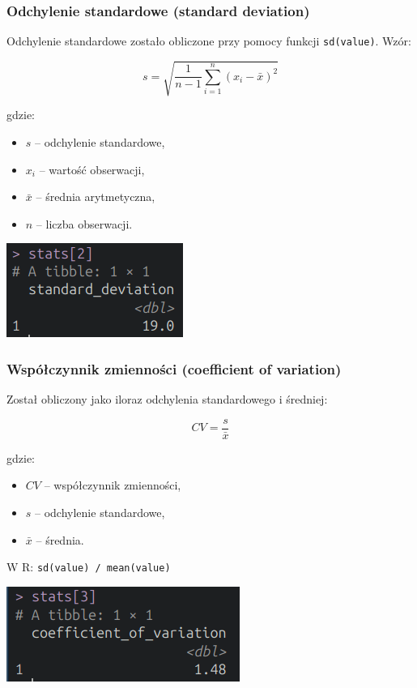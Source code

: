 \documentclass[polish]{article}
\begin{document}
    \subsubsection{Odchylenie standardowe (standard deviation)}

    Odchylenie standardowe zostało obliczone przy pomocy funkcji \texttt{sd(value)}. Wzór:

    \Large
    \[
    s = \sqrt{\frac{1}{n - 1} \sum_{i=1}^{n}(x_i - \bar{x})^2}
    \]
    \normalsize

    \noindent gdzie:
    \begin{itemize}
    \item \( s \) -- odchylenie standardowe,
    \item \( x_i \) -- wartość obserwacji,
    \item \( \bar{x} \) -- średnia arytmetyczna,
    \item \( n \) -- liczba obserwacji.
    \end{itemize}

    \begin{center}
        \includegraphics{img/sd.png}
    \end{center}

    \subsubsection{Współczynnik zmienności (coefficient of variation)}

    Został obliczony jako iloraz odchylenia standardowego i średniej:

    \Large
    \[
    CV = \frac{s}{\bar{x}}
    \]
    \normalsize

    \noindent gdzie:
    \begin{itemize}
    \item \( CV \) -- współczynnik zmienności,
    \item \( s \) -- odchylenie standardowe,
    \item \( \bar{x} \) -- średnia.
    \end{itemize}

    W R: \texttt{sd(value) / mean(value)}

    \begin{center}
        \includegraphics{img/cv.png}
    \end{center}
\end{document}
